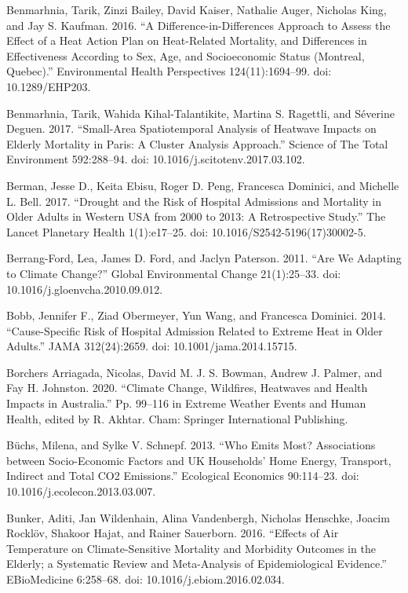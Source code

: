 \documentclass[12pt]{article}
\begin{document}
Benmarhnia, Tarik, Zinzi Bailey, David Kaiser, Nathalie Auger, Nicholas
King, and Jay S. Kaufman. 2016. ``A Difference-in-Differences Approach
to Assess the Effect of a Heat Action Plan on Heat-Related Mortality,
and Differences in Effectiveness According to Sex, Age, and
Socioeconomic Status (Montreal, Quebec).'' Environmental Health
Perspectives 124(11):1694--99. doi: 10.1289/EHP203.

Benmarhnia, Tarik, Wahida Kihal-Talantikite, Martina S. Ragettli, and
Séverine Deguen. 2017. ``Small-Area Spatiotemporal Analysis of Heatwave
Impacts on Elderly Mortality in Paris: A Cluster Analysis Approach.''
Science of The Total Environment 592:288--94. doi:
10.1016/j.scitotenv.2017.03.102.

Berman, Jesse D., Keita Ebisu, Roger D. Peng, Francesca Dominici, and
Michelle L. Bell. 2017. ``Drought and the Risk of Hospital Admissions
and Mortality in Older Adults in Western USA from 2000 to 2013: A
Retrospective Study.'' The Lancet Planetary Health 1(1):e17--25. doi:
10.1016/S2542-5196(17)30002-5.

Berrang-Ford, Lea, James D. Ford, and Jaclyn Paterson. 2011. ``Are We
Adapting to Climate Change?'' Global Environmental Change 21(1):25--33.
doi: 10.1016/j.gloenvcha.2010.09.012.

Bobb, Jennifer F., Ziad Obermeyer, Yun Wang, and Francesca Dominici.
2014. ``Cause-Specific Risk of Hospital Admission Related to Extreme
Heat in Older Adults.'' JAMA 312(24):2659. doi: 10.1001/jama.2014.15715.

Borchers Arriagada, Nicolas, David M. J. S. Bowman, Andrew J. Palmer,
and Fay H. Johnston. 2020. ``Climate Change, Wildfires, Heatwaves and
Health Impacts in Australia.'' Pp. 99--116 in Extreme Weather Events and
Human Health, edited by R. Akhtar. Cham: Springer International
Publishing.

Büchs, Milena, and Sylke V. Schnepf. 2013. ``Who Emits Most?
Associations between Socio-Economic Factors and UK Households' Home
Energy, Transport, Indirect and Total CO2 Emissions.'' Ecological
Economics 90:114--23. doi: 10.1016/j.ecolecon.2013.03.007.

Bunker, Aditi, Jan Wildenhain, Alina Vandenbergh, Nicholas Henschke,
Joacim Rocklöv, Shakoor Hajat, and Rainer Sauerborn. 2016. ``Effects of
Air Temperature on Climate-Sensitive Mortality and Morbidity Outcomes in
the Elderly; a Systematic Review and Meta-Analysis of Epidemiological
Evidence.'' EBioMedicine 6:258--68. doi: 10.1016/j.ebiom.2016.02.034.
\end{document}
